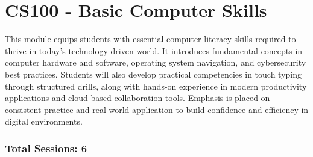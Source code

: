 
\section{CS100 - Basic Computer Skills}
\addtocounter{section}{1}

\begin{tcolorbox}[boxstyle, title={Module Overview}]
   This module equips students with essential computer literacy skills required to thrive in today’s technology-driven world. It introduces fundamental concepts in computer hardware and software, operating system navigation, and cybersecurity best practices. Students will also develop practical competencies in touch typing through structured drills, along with hands-on experience in modern productivity applications and cloud-based collaboration tools. Emphasis is placed on consistent practice and real-world application to build confidence and efficiency in digital environments.
\end{tcolorbox}

\subsubsection*{Total Sessions: 6} %

